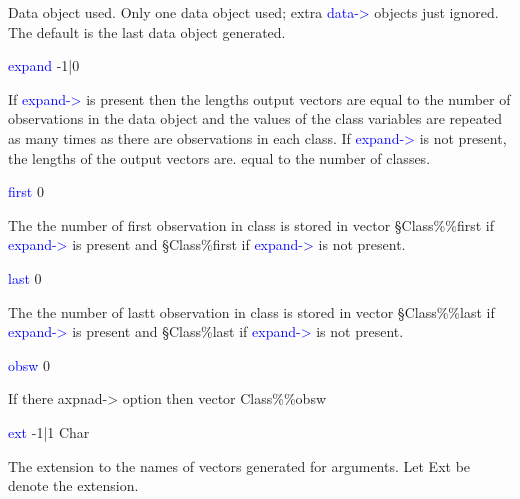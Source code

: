 \begin{changemargin}{3cm}{0cm}
\noindent Data object used. Only one data object used; extra \textcolor{blue}{data->} objects just ignored. The default is the last
data object generated.
\end{changemargin}
\vspace{0.3cm}
\hline
\vspace{0.3cm}
\noindent \textcolor{blue}{expand} \tabto{3cm} -1|0 \tabto{5cm}    \tabto{7cm}
\begin{changemargin}{3cm}{0cm}
\noindent If \textcolor{blue}{expand->} is present then the lengths output vectors are equal
to the number of observations in the data object and the values of the class variables
are repeated as many times as there are observations in each class. If
\textcolor{blue}{expand->} is not present, the lengths of the output vectors are.
equal to the number of classes.
\end{changemargin}
\vspace{0.3cm}
\hline
\vspace{0.3cm}
\noindent \textcolor{blue}{first} \tabto{3cm} 0 \tabto{5cm}    \tabto{7cm}
\begin{changemargin}{3cm}{0cm}
\noindent The the number of first observation in class is stored in vector
§Class\%\%first if \textcolor{blue}{expand->} is present and §Class\%first if \textcolor{blue}{expand->} is not present.
\end{changemargin}
\vspace{0.3cm}
\hline
\vspace{0.3cm}
\noindent \textcolor{blue}{last} \tabto{3cm} 0 \tabto{5cm}    \tabto{7cm}
\begin{changemargin}{3cm}{0cm}
\noindent The the number of lastt observation in class is stored in vector
§Class\%\%last if \textcolor{blue}{expand->} is present and §Class\%last if \textcolor{blue}{expand->} is not present.
\end{changemargin}
\vspace{0.3cm}
\hline
\vspace{0.3cm}
\noindent \textcolor{blue}{obsw} \tabto{3cm} 0 \tabto{5cm}    \tabto{7cm}
\begin{changemargin}{3cm}{0cm}
\noindent If there axpnad-> option then vector Class\%\%obsw
\end{changemargin}
\vspace{0.3cm}
\hline
\vspace{0.3cm}
\noindent \textcolor{blue}{ext} \tabto{3cm} -1|1 \tabto{5cm}  Char \tabto{7cm}
\begin{changemargin}{3cm}{0cm}
\noindent The extension to the names of vectors generated for arguments. Let
Ext be denote the extension.
\end{changemargin}
